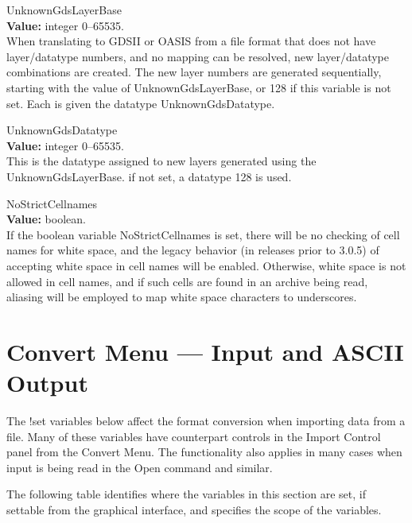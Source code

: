 \begin{description}
\item{\et UnknownGdsLayerBase}\\
{\bf Value:} integer 0--65535.\\
When translating to GDSII or OASIS from a file format that does not
have layer/datatype numbers, and no mapping can be resolved, new
layer/datatype combinations are created.  The new layer numbers are
generated sequentially, starting with the value of {\et
UnknownGdsLayerBase}, or 128 if this variable is not set.  Each is
given the datatype {\et UnknownGdsDatatype}.

\item{\et UnknownGdsDatatype}\\
{\bf Value:} integer 0--65535.\\
This is the datatype assigned to new layers generated using the
{\et UnknownGdsLayerBase}.  if not set, a datatype 128 is used.

\item{\et NoStrictCellnames}\\
{\bf Value:} boolean.\\
If the boolean variable {\et NoStrictCellnames} is set, there will be
no checking of cell names for white space, and the legacy behavior (in
releases prior to 3.0.5) of accepting white space in cell names will
be enabled.  Otherwise, white space is not allowed in cell names, and
if such cells are found in an archive being read, aliasing will be
employed to map white space characters to underscores.
\end{description}


\section{Convert Menu --- Input and ASCII Output}

The {\cb !set} variables below affect the format conversion when
importing data from a file.  Many of these variables have counterpart
controls in the {\cb Import Control} panel from the {\cb Convert
Menu}.  The functionality also applies in many cases when input is
being read in the {\cb Open} command and similar.

The following table identifies where the variables in this section are
set, if settable from the graphical interface, and specifies the scope
of the variables.

